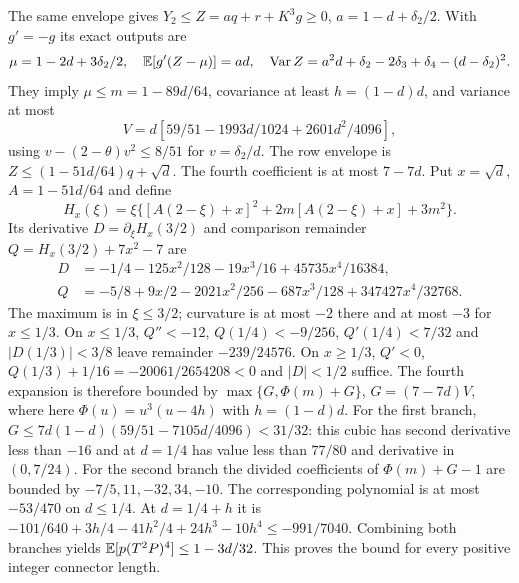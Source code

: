 The same envelope gives $Y_2\le Z=aq+r+K^3g\ge0$,
$a=1-d+\delta_{2}/2$. With $g'=-g$ its exact outputs are
\[
 \mu=1-2d+3\delta_{2}/2,\quad\mathbb E[g'(Z-\mu)]=ad,\quad
 \operatorname{Var}Z=a^2d+\delta_{2}-2\delta_{3}+\delta_{4}-(d-\delta_{2})^2.
\]
They imply $\mu\le m=1-89d/64$, covariance at least $h=(1-d)d$,
and variance at most
\[
 V=d[59/51-1993d/1024+2601d^2/4096],
\]
using $v-(2-\theta)v^2\le8/51$ for $v=\delta_{2}/d$.
The row envelope is $Z\le(1-51d/64)q+\sqrt d$.
The fourth coefficient is at most $7-7d$. Put $x=\sqrt d$,
$A=1-51d/64$ and define
\[
 H_x(\xi)=\xi\{[A(2-\xi)+x]^2+2m[A(2-\xi)+x]+3m^2\}.
\]
Its derivative $D=\partial_\xi H_x(3/2)$ and comparison remainder
$Q=H_x(3/2)+7x^2-7$ are
\begin{align*}
 D&=-1/4-125x^2/128-19x^3/16+45735x^4/16384,\\
 Q&=-5/8+9x/2-2021x^2/256-687x^3/128+347427x^4/32768.
\end{align*}
The maximum is in $\xi\le3/2$; curvature is at most $-2$ there and at
most $-3$ for $x\le1/3$.
On $x\le1/3$, $Q''<-12$, $Q(1/4)<-9/256$,
$Q'(1/4)<7/32$ and $|D(1/3)|<3/8$ leave remainder
$-239/24576$. On $x\ge1/3$, $Q'<0$,
$Q(1/3)+1/16=-20061/2654208<0$ and $|D|<1/2$ suffice.
The fourth expansion is therefore bounded by
$\max\{G,\Phi(m)+G\}$, $G=(7-7d)V$, where here $\Phi(u)=u^3(u-4h)$ with $h=(1-d)d$.
For the first branch,
$G\le7d(1-d)(59/51-7105d/4096)<31/32$:
this cubic has second derivative less than $-16$ and at $d=1/4$
has value less than $77/80$ and derivative in $(0,7/24)$.
For the second branch the divided coefficients of $\Phi(m)+G-1$
are bounded by $-7/5,11,-32,34,-10$.
The corresponding polynomial is at most $-53/470$ on $d\le1/4$.
At $d=1/4+h$ it is
$-101/640+3h/4-41h^2/4+24h^3-10h^4\le-991/7040$.
Combining both branches yields $\mathbb E[p(T^2P)^4]\le1-3d/32$.
This proves the bound for every positive integer connector length.
